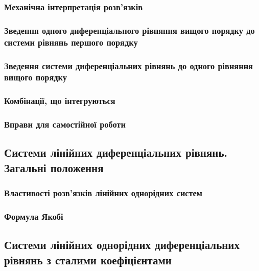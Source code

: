		\subsubsection{Механічна інтерпретація розв'язків}
		

		\subsubsection{Зведення одного диференціального рівняння вищого порядку до системи рівнянь першого порядку}
		

		\subsubsection{Зведення системи диференціальних рівнянь до одного рівняння вищого порядку}
		

		\subsubsection{Комбінації, що інтегруються}
		

		\subsubsection{Вправи для самостійної роботи}
		

	\subsection{Системи лінійних диференціальних рівнянь. Загальні положення}
	

		\subsubsection{Властивості розв'язків лінійних однорідних систем}
		

		\subsubsection{Формула Якобі}
		

	\subsection{Системи лінійних однорідних диференціальних рівнянь з сталими коефіцієнтами \todo}
	

